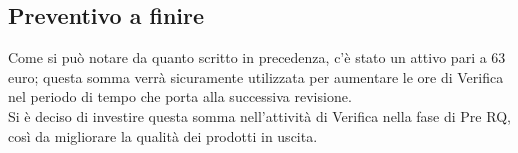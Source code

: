\subsection{Preventivo a finire}
Come si può notare da quanto scritto in precedenza, c'è stato un attivo pari a 63 euro; questa somma verrà sicuramente utilizzata per aumentare le ore di Verifica nel periodo di tempo che porta alla successiva revisione.\\
Si è deciso di investire questa somma nell'attività di Verifica nella fase di Pre RQ, così da migliorare la qualità dei prodotti in uscita. 
